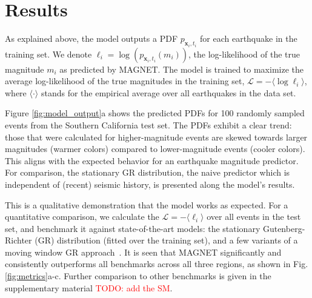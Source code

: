 \documentclass[pdflatex]{sn-jnl}
\newcommand{\yohai}[1]{{\textcolor{red}{#1}}}
\begin{document}
\section{Results} \label{sec:results}
As explained above, the model outputs a PDF $p_{\textbf{x}_i, t_i}$ for each earthquake in the training set. We denote $\ell_i=\log\left(p_{\textbf{x}_i, t_i}(m_i)\right)$, the log-likelihood of the true magnitude $m_i$ as predicted by MAGNET.
The model is trained to maximize the average log-likelihood of the true magnitudes in the training set, $\mathcal{L} = -\langle \log{ \ell_i } \rangle$, where $\langle \cdot\rangle$ stands for the empirical average over all earthquakes in the data set. 


Figure \ref{fig:model_output}a shows the predicted PDFs for 100 randomly sampled events from the Southern California test set. The PDFs exhibit a clear trend: those that were calculated for higher-magnitude events are skewed towards larger magnitudes (warmer colors) compared to lower-magnitude events (cooler colors). This aligns with the expected behavior for an earthquake magnitude predictor. For comparison, the stationary GR distribution, the naive predictor which is independent of (recent) seismic history, is presented along the model's results.

This is a qualitative demonstration that the model works as expected. For a quantitative comparison, we calculate the $\mathcal{L}=-\langle \ell_i \rangle$ over all events in the test set, and benchmark it against state-of-the-art models:
the stationary Gutenberg-Richter (GR) distribution (fitted over the training set), and a few variants of a moving window GR approach~\cite{gulia_real-time_2019}. It is seen that MAGNET significantly and consistently outperforms all benchmarks across all three regions, as shown in Fig. \ref{fig:metrics}a-c. Further comparison to other benchmarks is given in the supplementary material \yohai{TODO: add the SM}.
\end{document}
